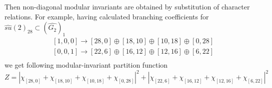 \documentclass[a4paper,12pt]{article}
\theoremstyle{definition} \newtheorem{Def}{Definition}
\begin{document}
  Then non-diagonal modular invariants are obtained by substitution of character relations. For example, having calculated branching coefficients for $\hat{su}(2)_{28}\subset (\hat{G_2})_1$
  \begin{equation}
    \label{eq:113}
    \begin{aligned}
      & [1,0,0]\to [28,0]\oplus [18,10]\oplus [10,18]\oplus [0,28]\\
      & [0,0,1]\to [22,6]\oplus [16,12]\oplus [12,16]\oplus [6,22]\\
    \end{aligned}
  \end{equation}
we get following modular-invariant partition function
\begin{equation}
  \label{eq:114}
  Z=\left|\chi_{[28,0]}+\chi_{[18,10]}+\chi_{[10,18]}+\chi_{[0,28]}\right|^2+\left|\chi_{[22,6]}+\chi_{[16,12]}+\chi_{[12,16]}+\chi_{[6,22]}\right|^2
\end{equation}

{}

\end{document}
